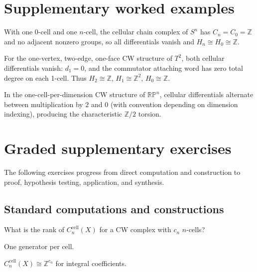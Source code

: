 \section{Supplementary worked examples}
\label{sec:viii18-pedagogy}

\begin{example}\label{ex:viii18-ped-01}
With one 0-cell and one $n$-cell, the cellular chain complex of $S^n$ has $C_n=C_0=\mathbb Z$ and no adjacent nonzero groups, so all differentials vanish and $H_n\cong H_0\cong\mathbb Z$.
\end{example}

\begin{example}\label{ex:viii18-ped-02}
For the one-vertex, two-edge, one-face CW structure of $T^2$, both cellular differentials vanish: $d_1=0$, and the commutator attaching word has zero total degree on each 1-cell. Thus $H_2\cong\mathbb Z$, $H_1\cong\mathbb Z^2$, $H_0\cong\mathbb Z$.
\end{example}

\begin{example}\label{ex:viii18-ped-03}
In the one-cell-per-dimension CW structure of $\mathbb{RP}^n$, cellular differentials alternate between multiplication by $2$ and $0$ (with convention depending on dimension indexing), producing the characteristic $\mathbb Z/2$ torsion.
\end{example}

\section{Graded supplementary exercises}
The following exercises progress from direct computation and construction to proof, hypothesis testing, application, and synthesis.

\subsection*{Standard computations and constructions}

\begin{exercise}\label{exr:viii18-ped-01}
What is the rank of $C_n^{\mathrm{cell}}(X)$ for a CW complex with $c_n$ $n$-cells?
\end{exercise}
\begin{hint}
One generator per cell.
\end{hint}
\begin{solution}
$C_n^{\mathrm{cell}}(X)\cong\mathbb Z^{c_n}$ for integral coefficients.
\end{solution}

